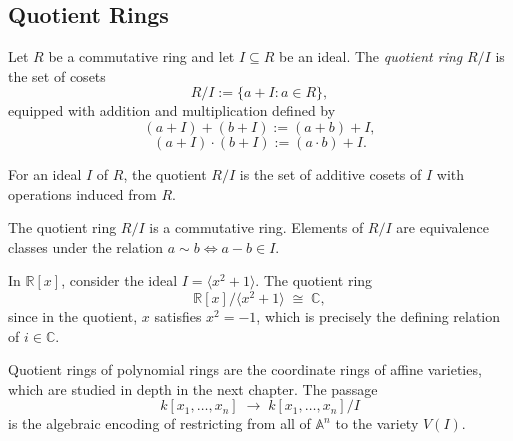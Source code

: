 \subsection*{Quotient Rings}

\begin{definition}
\label{def:quotient-ring}
Let $R$ be a commutative ring and let $I \subseteq R$ be an ideal.
The \emph{quotient ring} $R/I$ is the set of cosets
\[
R/I := \{ a + I : a \in R \},
\]
equipped with addition and multiplication defined by
\[
(a + I) + (b + I) := (a + b) + I,
\]
\[
(a + I) \cdot (b + I) := (a \cdot b) + I.
\]
\end{definition}

\begin{remark*}
For an ideal $I$ of $R$, the quotient $R/I$ is the set of additive cosets of
$I$ with operations induced from $R$.
\end{remark*}

\begin{remark*}[Interpretation]
The quotient ring $R/I$ is a commutative ring.
Elements of $R/I$ are equivalence classes under the relation
$a \sim b \iff a - b \in I$.
\end{remark*}

\begin{example*}
In $\mathbb{R}[x]$, consider the ideal $I = \langle x^2 + 1 \rangle$.
The quotient ring
\[
\mathbb{R}[x] / \langle x^2 + 1 \rangle \;\cong\; \mathbb{C},
\]
since in the quotient, $x$ satisfies $x^2 = -1$,
which is precisely the defining relation of $i \in \mathbb{C}$.
\end{example*}

\begin{remark*}
Quotient rings of polynomial rings are the coordinate rings
of affine varieties, which are studied in depth in the next chapter.
The passage
\[
k[x_1,\dots,x_n] \;\longrightarrow\; k[x_1,\dots,x_n]/I
\]
is the algebraic encoding of restricting from all of $\mathbb{A}^n$
to the variety $V(I)$.
\end{remark*}
